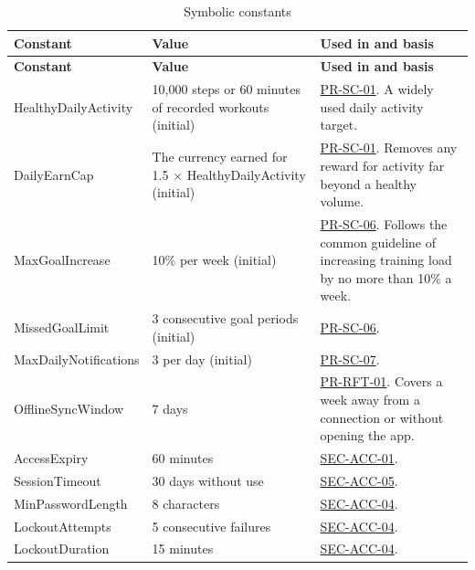 \documentclass[12pt]{article}
\begin{document}
{\small
\begin{xltabular}{\textwidth}{|p{4.1cm}|p{3.4cm}|X|}
\caption{Symbolic constants}\label{tab:constants}\\
\hline
\textbf{Constant} & \textbf{Value} & \textbf{Used in and basis} \\
\hline
\endfirsthead
\hline
\textbf{Constant} & \textbf{Value} & \textbf{Used in and basis} \\
\hline
\endhead
\textsf{HealthyDailyActivity}\hypertarget{const:HealthyDailyActivity}{} & 10{,}000 steps or 60 minutes of recorded workouts (initial) & \hyperlink{req:PR-SC-01}{PR-SC-01}. A widely used daily activity target. \\
\textsf{DailyEarnCap}\hypertarget{const:DailyEarnCap}{} & The currency earned for 1.5 $\times$ \textsf{HealthyDailyActivity} (initial) & \hyperlink{req:PR-SC-01}{PR-SC-01}. Removes any reward for activity far beyond a healthy volume. \\
\textsf{MaxGoalIncrease}\hypertarget{const:MaxGoalIncrease}{} & 10\% per week (initial) & \hyperlink{req:PR-SC-06}{PR-SC-06}. Follows the common guideline of increasing training load by no more than 10\% a week. \\
\textsf{MissedGoalLimit}\hypertarget{const:MissedGoalLimit}{} & 3 consecutive goal periods (initial) & \hyperlink{req:PR-SC-06}{PR-SC-06}. \\
\textsf{MaxDailyNotifications}\hypertarget{const:MaxDailyNotifications}{} & 3 per day (initial) & \hyperlink{req:PR-SC-07}{PR-SC-07}. \\
\textsf{OfflineSyncWindow}\hypertarget{const:OfflineSyncWindow}{} & 7 days & \hyperlink{req:PR-RFT-01}{PR-RFT-01}. Covers a week away from a connection or without opening the app. \\
\textsf{AccessExpiry}\hypertarget{const:AccessExpiry}{} & 60 minutes & \hyperlink{req:SEC-ACC-01}{SEC-ACC-01}. \\
\textsf{SessionTimeout}\hypertarget{const:SessionTimeout}{} & 30 days without use & \hyperlink{req:SEC-ACC-05}{SEC-ACC-05}. \\
\textsf{MinPasswordLength}\hypertarget{const:MinPasswordLength}{} & 8 characters & \hyperlink{req:SEC-ACC-04}{SEC-ACC-04}. \\
\textsf{LockoutAttempts}\hypertarget{const:LockoutAttempts}{} & 5 consecutive failures & \hyperlink{req:SEC-ACC-04}{SEC-ACC-04}. \\
\textsf{LockoutDuration}\hypertarget{const:LockoutDuration}{} & 15 minutes & \hyperlink{req:SEC-ACC-04}{SEC-ACC-04}. \\

\end{xltabular}}
\end{document}
